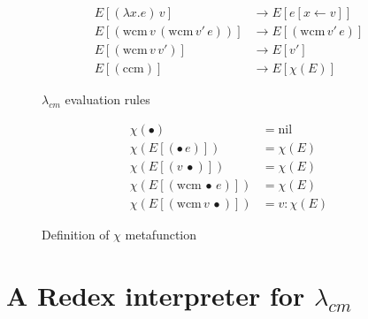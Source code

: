 \documentclass[ms,electronic,twosidetoc,letterpaper,chaptercenter,parttop]{byumsphd}
\newcommand{\app}[2]{(#1\,#2)}
\newcommand{\wcm}[2]{(\mathrm{wcm}\,#1\,#2)}
\newcommand{\ccm}{(\mathrm{ccm})}
\newcommand{\hole}{\bullet}
\begin{document}
\begin{figure}
\begin{align*}
E[(\lambda x.e)\,v]     &\rightarrow E[e[x\leftarrow v]]\\
E[\wcm{v}{\wcm{v'}{e}}] &\rightarrow E[\wcm{v'}{e}]\\
E[\wcm{v}{v'}]          &\rightarrow E[v']\\
E[\ccm]                 &\rightarrow E[\chi(E)]
\end{align*}
\caption{$\lambda_{cm}$ evaluation rules}
\label{language-semantics}
\end{figure}

\begin{figure}
\begin{align*}
\chi(\hole)             &= \mathrm{nil}\\
\chi(E[\app{\hole}{e}]) &= \chi(E)\\
\chi(E[\app{v}{\hole}]) &= \chi(E)\\
\chi(E[\wcm{\hole}{e}]) &= \chi(E)\\
\chi(E[\wcm{v}{\hole}]) &= v : \chi(E)
\end{align*}
\caption{Definition of $\chi$ metafunction}
\label{chi-metafunction}
\end{figure}

\section{A Redex interpreter for $\lambda_{cm}$}
\end{document}
